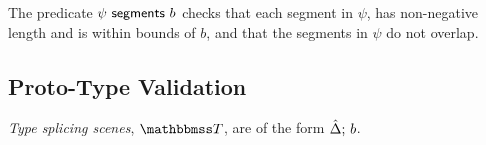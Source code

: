 
The predicate $\psi~\mathsf{segments}~b$ checks that each segment in $\psi$, has non-negative length and is within bounds of $b$, and that the segments in $\psi$ do not overlap.


\subsection{Proto-Type Validation}\label{appendix:proto-type-validation-SES}
\emph{Type splicing scenes}, $\tscenev$, are of the form $\hat{\Delta};\,b$.

